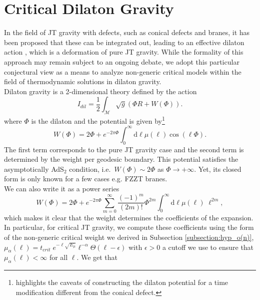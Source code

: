 \documentclass[a4paper,11pt]{article}
\newcommand{\rmd}{\mathrm{d}}
\begin{document}
\section{Critical Dilaton Gravity}\label{Section_Dilaton_gravity}
In the field of JT gravity with defects, such as conical defects and branes,  it has been proposed that these can be integrated out, leading to an effective dilaton action \cite{Witten:2020wvy, Turi:2020ale, Gao:2021uro}, which is a deformation of pure JT gravity. While the formality of this approach may remain subject to an ongoing debate, we adopt this particular conjectural view as a means to analyze non-generic critical models within the field of thermodynamic solutions in dilaton gravity.\\
Dilaton gravity is a 2-dimensional theory defined by the action 
\begin{equation}
    I_{dil}=\frac{1}{2}\int_{\mathcal{M}}\sqrt{g}(\Phi R+W(\Phi)).\label{eq:dilaton_action}
\end{equation}
where $\Phi$ is the dilaton and the potential is given by\footnote{\cite{Okuyama:2021FZZT} highlights the caveats of constructing the dilaton potential for a time modification different from the conical defect.}
    \begin{equation}    W(\Phi)=2\Phi+e^{-2\pi\Phi}\int_0^\infty \rmd \ell \mu(\ell)\cos\left(\ell \Phi\right).\label{eq:dilaton_pot_general}
    \end{equation}
The first term corresponds to the pure JT gravity case and the second term is determined by the weight per geodesic boundary. This potential satisfies the asymptotically AdS$_2$ condition, i.e.\ $W(\Phi)\sim 2\Phi$ as $\Phi\rightarrow +\infty$. Yet, its closed form  is only known for a few cases e.g. FZZT branes.\\
We can also write it as a power series 
    \begin{equation}    W(\Phi)=2\Phi+e^{-2\pi\Phi}\sum_{m=0}^\infty \frac{(-1)^m}{(2m)!}\Phi^{2m}\int_0^\infty \rmd \ell \mu(\ell)\;\ell^{2m}\label{eq:dilaton_pot_series},
    \end{equation}
which makes it clear that the weight determines the coefficients of the expansion. In particular, for critical JT gravity, we compute these coefficients using the form of the non-generic critical weight we derived in Subsection \ref{subsection:hyp_o(n)}, $\mu_{\alpha}(\ell)= t_{crit}\;e^{-\ell \sqrt{E_\mu}}\ell^{-\alpha}  \Theta(\ell-\epsilon)$ with $\epsilon>0$ a cutoff we use to ensure that $\mu_\alpha(\ell)<\infty$ for all $\ell$. We get that 
\end{document}
